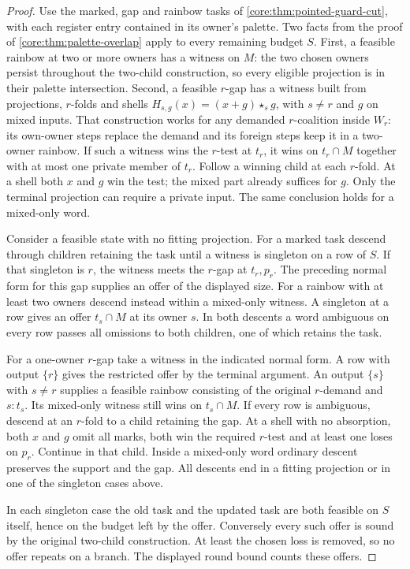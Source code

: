 \begin{proof}
Use the marked, gap and rainbow tasks of
\cref{core:thm:pointed-guard-cut}, with each register entry
contained in its owner's palette. Two facts from the proof of
\cref{core:thm:palette-overlap} apply to every remaining budget $S$.
First, a feasible rainbow at two or more owners has a witness on
$M$: the two chosen owners persist throughout the two-child
construction, so every eligible projection is in their palette
intersection. Second, a feasible $r$-gap has a witness built from
projections, $r$-folds and shells $H_{s,g}(x)=(x+g)\star_s g$,
with $s\ne r$ and $g$ on mixed inputs. That construction works for
any demanded $r$-coalition inside $W_r$: its own-owner steps replace
the demand and its foreign steps keep it in a two-owner rainbow.
If such a witness wins the $r$-test at $t_r$, it wins on $t_r\cap M$
together with at most one private member of $t_r$. Follow a winning
child at each $r$-fold. At a shell both $x$ and $g$ win the test;
the mixed part already suffices for $g$. Only the terminal projection
can require a private input. The same conclusion holds for a
mixed-only word.

Consider a feasible state with no fitting projection. For a marked
task descend through children retaining the task until a witness is
singleton on a row of $S$. If that singleton is $r$, the witness
meets the $r$-gap at $t_r,p_r$. The preceding normal form for this
gap supplies an offer of the displayed size. For a rainbow with at
least two owners descend instead within a mixed-only witness. A
singleton at a row gives an offer $t_s\cap M$ at its owner $s$.
In both descents a word ambiguous on every row passes all omissions
to both children, one of which retains the task.

For a one-owner $r$-gap take a witness in the indicated normal
form. A row with output $\{r\}$ gives the restricted offer by the
terminal argument. An output $\{s\}$ with $s\ne r$ supplies a
feasible rainbow consisting of the original $r$-demand and $s:t_s$.
Its mixed-only witness still wins on $t_s\cap M$. If every row
is ambiguous, descend at an $r$-fold to a child retaining the gap.
At a shell with no absorption, both $x$ and $g$ omit all marks,
both win the required $r$-test and at least one loses on $p_r$.
Continue in that child. Inside a mixed-only word ordinary descent
preserves the support and the gap. All descents end in a fitting
projection or in one of the singleton cases above.

In each singleton case the old task and the updated task are both
feasible on $S$ itself, hence on the budget left by the offer.
Conversely every such offer is sound by the original two-child
construction. At least the chosen loss is removed, so no offer
repeats on a branch. The displayed round bound counts these offers.


\end{proof}

